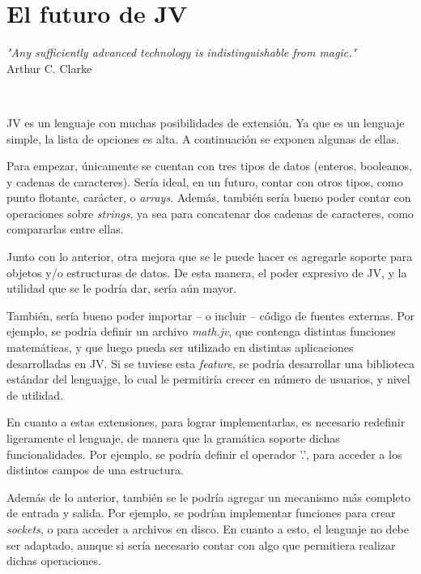 \documentclass{article}
\begin{document}
    \section{El futuro de JV}
        \begin{center}
            \par\textit{"Any sufficiently advanced technology is indistinguishable from magic."}\\Arthur C. Clarke\\
        \end{center}
        \\
        \par JV es un lenguaje con muchas posibilidades de extensión. Ya que es un lenguaje simple, la lista de opciones es alta. A continuación se exponen algunas de ellas.
        \\
        \par Para empezar, únicamente se cuentan con tres tipos de datos (enteros, booleanos, y cadenas de caracteres). Sería ideal, en un futuro, contar con otros tipos, como punto flotante, carácter, o \textit{arrays}. Además, también sería bueno poder contar con operaciones sobre \textit{strings}, ya sea para concatenar dos cadenas de caracteres, como compararlas entre ellas.
        \par Junto con lo anterior, otra mejora que se le puede hacer es agregarle soporte para objetos y/o estructuras de datos. De esta manera, el poder expresivo de JV, y la utilidad que se le podría dar, sería aún mayor.
        \par También, sería bueno poder importar – o incluir – código de fuentes externas. Por ejemplo, se podría definir un archivo \textit{math.jv}, que contenga distintas funciones matemáticas, y que luego pueda ser utilizado en distintas aplicaciones desarrolladas en JV. Si se tuviese esta \textit{feature}, se podría desarrollar una biblioteca estándar del lenguajge, lo cual le permitiría crecer en número de usuarios, y nivel de utilidad.
        \par En cuanto a estas extensiones, para lograr implementarlas, es necesario redefinir ligeramente el lenguaje, de manera que la gramática soporte dichas funcionalidades. Por ejemplo, se podría definir el operador '.', para acceder a los distintos campos de una estructura.
        \\
        \par Además de lo anterior, también se le podría agregar un mecanismo más completo de entrada y salida. Por ejemplo, se podrían implementar funciones para crear \textit{sockets}, o para acceder a archivos en disco. En cuanto a esto, el lenguaje no debe ser adaptado, aunque si sería necesario contar con algo que permitiera realizar dichas operaciones.
\end{document}
